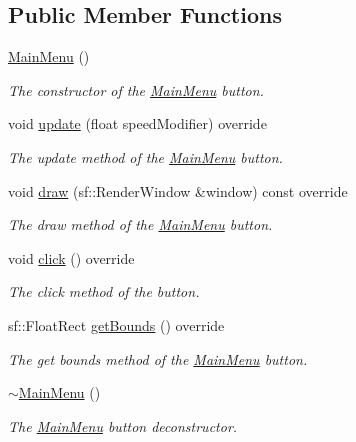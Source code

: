 \subsection*{Public Member Functions}
\begin{DoxyCompactItemize}
\item 
\hyperlink{class_main_menu_a53eecf9d5ffd094f54ac4193e7e57eaf}{Main\+Menu} ()
\begin{DoxyCompactList}\small\item\em The constructor of the \hyperlink{class_main_menu}{Main\+Menu} button. \end{DoxyCompactList}\item 
void \hyperlink{class_main_menu_a41b86746c468d18532123dfda01425de}{update} (float speed\+Modifier) override
\begin{DoxyCompactList}\small\item\em The update method of the \hyperlink{class_main_menu}{Main\+Menu} button. \end{DoxyCompactList}\item 
void \hyperlink{class_main_menu_a2956b42855e47b2e8e10412a26ef672b}{draw} (sf\+::\+Render\+Window \&window) const override
\begin{DoxyCompactList}\small\item\em The draw method of the \hyperlink{class_main_menu}{Main\+Menu} button. \end{DoxyCompactList}\item 
void \hyperlink{class_main_menu_ac97a553b913177aeabeb0bfcc4b54caa}{click} () override
\begin{DoxyCompactList}\small\item\em The click method of the button. \end{DoxyCompactList}\item 
sf\+::\+Float\+Rect \hyperlink{class_main_menu_a6a52b7d7cb8e09360ebc3428aad67ed1}{get\+Bounds} () override
\begin{DoxyCompactList}\small\item\em The get bounds method of the \hyperlink{class_main_menu}{Main\+Menu} button. \end{DoxyCompactList}\item 
\hyperlink{class_main_menu_a0a19ddba3ac52bf39c09b579171c98f2}{$\sim$\+Main\+Menu} ()
\begin{DoxyCompactList}\small\item\em The \hyperlink{class_main_menu}{Main\+Menu} button deconstructor. \end{DoxyCompactList}\end{DoxyCompactItemize}
